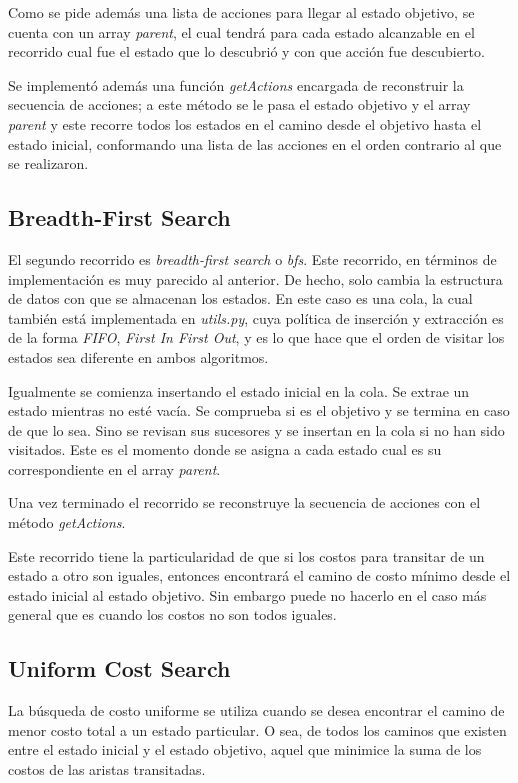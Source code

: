 \documentclass[12pt]{article}
\begin{document}
Como se pide adem\'as una lista de acciones para llegar al estado objetivo, se cuenta con un array \emph{parent}, el cual tendr\'a para cada estado alcanzable en el recorrido cual fue el estado que lo descubri\'o y con que acci\'on fue descubierto.

Se implement\'o adem\'as una funci\'on \emph{getActions} encargada de reconstruir la secuencia de acciones; a este m\'etodo se le pasa el estado objetivo y el array \emph{parent} y este recorre todos los estados en el camino desde el objetivo hasta el estado inicial, conformando una lista de las acciones en el orden contrario al que se realizaron.

\subsection{Breadth-First Search}

El segundo recorrido es \emph{breadth-first search} o \emph{bfs}. Este recorrido, en t\'erminos de implementaci\'on es muy parecido al anterior. De hecho, solo cambia la estructura de datos con que se almacenan los estados. En este caso es una cola, la cual tambi\'en est\'a implementada en \emph{utils.py}, cuya pol\'itica de inserci\'on y extracci\'on es de la forma \emph{FIFO}, \emph{First In First Out}, y es lo que hace que el orden de visitar los estados sea diferente en ambos algoritmos.

Igualmente se comienza insertando el estado inicial en la cola. Se extrae un estado mientras no est\'e vac\'ia. Se comprueba si es el objetivo y se termina en caso de que lo sea. Sino se revisan sus sucesores y se insertan en la cola si no han sido visitados. Este es el momento donde se asigna a cada estado cual es su correspondiente en el array \emph{parent}.

Una vez terminado el recorrido se reconstruye la secuencia de acciones con el m\'etodo \emph{getActions}.

Este recorrido tiene la particularidad de que si los costos para transitar de un estado a otro son iguales, entonces encontrar\'a el camino de costo m\'inimo desde el estado inicial al estado objetivo. Sin embargo puede no hacerlo en el caso m\'as general que es cuando los costos no son todos iguales.

\subsection{Uniform Cost Search}

La b\'usqueda de costo uniforme se utiliza cuando se desea encontrar el camino de menor costo total a un estado particular. O sea, de todos los caminos que existen entre el estado inicial y el estado objetivo, aquel que minimice la suma de los costos de las aristas transitadas.
\end{document}
